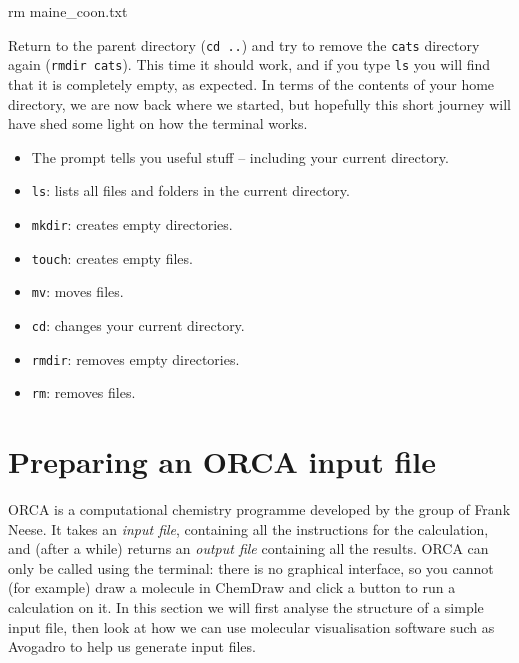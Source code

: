 \documentclass[10pt]{article}
\begin{document}
\begin{cmdline}
rm maine_coon.txt
\end{cmdline}

Return to the parent directory (\texttt{cd ..}) and try to remove the \texttt{cats} directory again (\texttt{rmdir cats}). This time it should work, and if you type \texttt{ls} you will find that it is completely empty, as expected. In terms of the contents of your home directory, we are now back where we started, but hopefully this short journey will have shed some light on how the terminal works.

\begin{summary}
   \begin{itemize}[leftmargin=0.6cm]
        \item The prompt tells you useful stuff -- including your current directory.
        \item \texttt{ls}: lists all files and folders in the current directory.
        \item \texttt{mkdir}: creates empty directories.
        \item \texttt{touch}: creates empty files.
        \item \texttt{mv}: moves files.
        \item \texttt{cd}: changes your current directory.
        \item \texttt{rmdir}: removes empty directories.
        \item \texttt{rm}: removes files.
    \end{itemize}
\end{summary}

\section{Preparing an ORCA input file}

ORCA is a computational chemistry programme developed by the group of Frank Neese. It takes an \textit{input file}, containing all the instructions for the calculation, and (after a while) returns an \textit{output file} containing all the results. ORCA can only be called using the terminal: there is no graphical interface, so you cannot (for example) draw a molecule in ChemDraw and click a button to run a calculation on it. In this section we will first analyse the structure of a simple input file, then look at how we can use molecular visualisation software such as Avogadro to help us generate input files.
\end{document}
